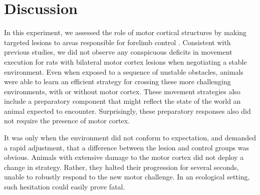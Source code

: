 \section{Discussion}

In this experiment, we assessed the role of motor cortical structures by making targeted lesions to areas responsible for forelimb control \cite{Kawai2015,Otchy2015}. Consistent with previous studies, we did not observe any conspicuous deficits in movement execution for rats with bilateral motor cortex lesions when negotiating a stable environment. Even when exposed to a sequence of unstable obstacles, animals were able to learn an efficient strategy for crossing these more challenging environments, with or without motor cortex. These movement strategies also include a preparatory component that might reflect the state of the world an animal expected to encounter. Surprisingly, these preparatory responses also did not require the presence of motor cortex.

It was only when the environment did not conform to expectation, and demanded a rapid adjustment, that a difference between the lesion and control groups was obvious. Animals with extensive damage to the motor cortex did not deploy a change in strategy. Rather, they halted their progression for several seconds, unable to robustly respond to the new motor challenge. In an ecological setting, such hesitation could easily prove fatal.
